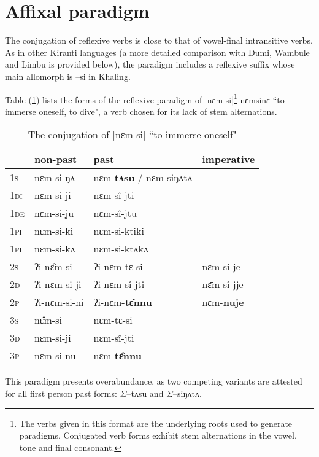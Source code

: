 \documentclass[twoside,a4paper,11pt]{article}
\newcommand{\ipa}[1]{{\phon#1}}
\newcommand{\grise}[1]{\cellcolor{lightgray}\textbf{#1}}
\newcommand{\ro}{$\Sigma$}
\begin{document}
\section{Affixal paradigm}
The conjugation of reflexive verbs is close to that of vowel-final intransitive verbs. As in other Kiranti languages (a more detailed comparison with Dumi, Wambule and Limbu is provided below), the paradigm includes a reflexive suffix  whose main allomorph is \ipa{--si} in Khaling. 

Table (\ref{tab:nyamsi}) lists the forms of the reflexive paradigm of   |\ipa{nɛm-si}|\footnote{The verbs  given in this format are the underlying roots used to generate paradigms. Conjugated verb forms exhibit stem alternations in the vowel, tone and final consonant.}
 \ipa{nɛmsinɛ}  ``to immerse oneself, to dive", a verb chosen for its lack of stem alternations.

\begin{table}[h]
\caption{The conjugation of |\ipa{nɛm-si}|  ``to immerse oneself"  } \centering \label{tab:nyamsi}
\begin{tabular}{l|l|l|l}  
\toprule
& non-past & past & imperative\\
\midrule
\textsc{1s}  &  \ipa{nɛm-si-ŋʌ}   &  \ipa{nɛm-\textbf{tʌsu}} / \ipa{nɛm-siŋʌtʌ}  \grise{}\\ 
\textsc{1di}  &  \ipa{nɛm-si-ji}   &  \ipa{nɛm-sî-jti} \\
\textsc{1de}  &  \ipa{nɛm-si-ju}   &  \ipa{nɛm-sî-jtu} \\ 
\textsc{1pi}  &  \ipa{nɛm-si-ki}   &  \ipa{nɛm-si-ktiki} \\ 
\textsc{1pi}  &  \ipa{nɛm-si-kʌ}   &  \ipa{nɛm-si-ktʌkʌ} \\ 
\midrule
\textsc{2s}  &  \ipa{ʔi-nɛ̂m-si}   &  \ipa{ʔi-nɛm-tɛ-si}   &  \ipa{nɛm-si-je} \\ 
\textsc{2d}  &  \ipa{ʔi-nɛm-si-ji}   &  \ipa{ʔi-nɛm-sî-jti}   &  \ipa{nɛ̄m-sî-jje} \\
\textsc{2p}  &  \ipa{ʔi-nɛm-si-ni}   &  \ipa{ʔi-nɛm-\textbf{tɛ̂nnu}} \grise{}  &  \ipa{nɛm-\textbf{nuje}} \grise{}\\ 
\midrule
\textsc{3s}  &  \ipa{nɛ̂m-si}   &  \ipa{nɛm-tɛ-si} \\ 
\textsc{3d}  &  \ipa{nɛm-si-ji}   &  \ipa{nɛm-sî-jti} \\ 
\textsc{3p}  &  \ipa{nɛm-si-nu}   &  \ipa{nɛm-\textbf{tɛ̂nnu}} \grise{}\\ 
\bottomrule
\end{tabular}
\end{table}
This paradigm presents overabundance, as two competing variants are attested for all first person past forms: \ro{}\ipa{--tʌsu} and \ro{}\ipa{--siŋʌtʌ}.
\end{document}
